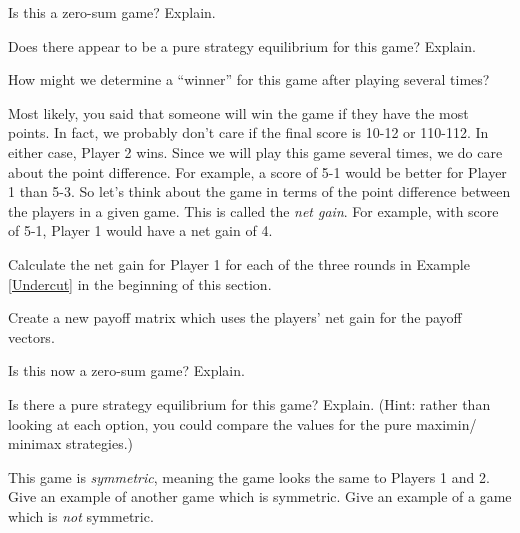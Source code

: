 \begin{xca}\label{E:Unotzerosum}
Is this a zero-sum game? Explain.
\end{xca}

\begin{xca}\label{E:Upureeq}
Does there appear to be a pure strategy equilibrium for this game? Explain.
\end{xca}

\begin{xca}\label{E:Uwinner}
How might we determine a ``winner'' for this game after playing several times? 
\end{xca}


Most likely, you said that someone will win the game if they have the most points. In fact, we probably don't care if the final score is 10-12 or 110-112. In either case, Player 2 wins. Since we will play this game several times, we do care about the point difference. For example, a score of 5-1 would be better for Player 1 than 5-3. So let's think about the game in terms of the point difference between the players in a given game. This is called the \emph{net gain}. For example, with score of 5-1, Player 1 would have a net gain of 4.

\begin{xca}\label{E:Unetgainex}
Calculate the net gain for Player 1 for each of the three rounds in Example \ref{Undercut} in the beginning of this section.
\end{xca}

\begin{xca}\label{E:Unetmatrix}
Create a new payoff matrix which uses the players' net gain for the payoff vectors.
\end{xca}

\begin{xca}\label{E:Uzerosum} 
Is this now a zero-sum game? Explain.
\end{xca}

\begin{xca}\label{E:Unetpureeq}
Is there a pure strategy equilibrium for this game? Explain. (Hint: rather than looking at each option, you could compare the values for the pure maximin/ minimax strategies.)
\end{xca}

\begin{xca}\label{E:Usymmetric}
This game is \emph{symmetric}, meaning the game looks the same to Players 1 and 2. Give an example of another game which is symmetric. Give an example of a game which is \emph{not} symmetric.
\end{xca}

